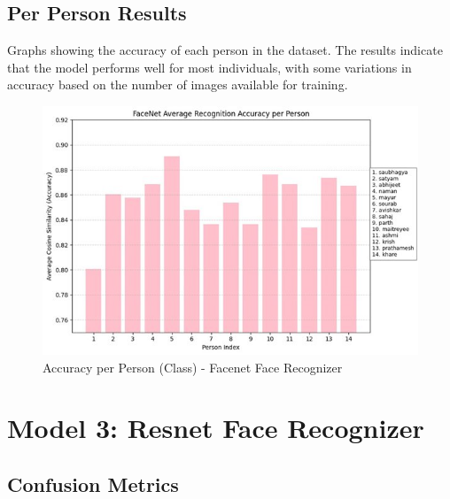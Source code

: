 \documentclass[openany]{report}
\begin{document}
\subsection{Per Person Results}
Graphs showing the accuracy of each person in the dataset. The results indicate that the model performs well for most individuals, with some variations in accuracy based on the number of images available for training.
\begin{figure}[H]
    \centering
    \includegraphics[width=.95\textwidth]{../imgs/model_2_per_person.jpg}
    \caption{Accuracy per Person (Class) - Facenet Face Recognizer}
\end{figure}

\section{Model 3: Resnet Face Recognizer}
\subsection{Confusion Metrics}
\end{document}
